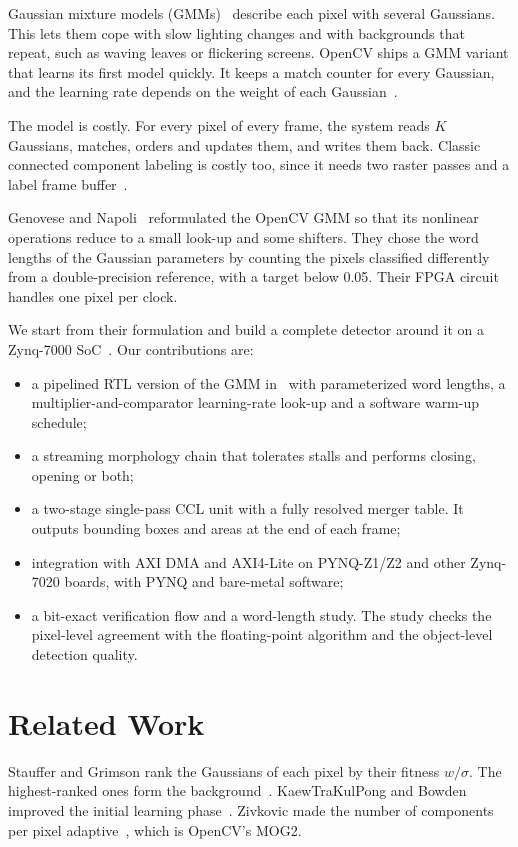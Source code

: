 \documentclass[conference]{IEEEtran}
\begin{document}
Gaussian mixture models (GMMs)~\cite{stauffer1999,kaew2001} describe each pixel
with several Gaussians. This lets them cope with slow lighting changes and with
backgrounds that repeat, such as waving leaves or flickering screens. OpenCV
ships a GMM variant that learns its first model quickly. It keeps a match
counter for every Gaussian, and the learning rate depends on the weight of each
Gaussian~\cite{genovese2014}.

The model is costly. For every pixel of every frame, the system reads $K$
Gaussians, matches, orders and updates them, and writes them back. Classic
connected component labeling is costly too, since it needs two raster passes and
a label frame buffer~\cite{rosenfeld1966}.

Genovese and Napoli~\cite{genovese2014} reformulated the OpenCV GMM so that its
nonlinear operations reduce to a small look-up and some shifters. They chose the
word lengths of the Gaussian parameters by counting the pixels classified
differently from a double-precision reference, with a target below 0.05. Their
FPGA circuit handles one pixel per clock.

We start from their formulation and build a complete detector around it on a
Zynq-7000 SoC~\cite{ug585}. Our contributions are:
\begin{itemize}\setlength{\itemsep}{0pt}\setlength{\parsep}{0pt}\setlength{\topsep}{1pt}
\item a pipelined RTL version of the GMM in~\cite{genovese2014} with
      parameterized word lengths, a multiplier-and-comparator learning-rate
      look-up and a software warm-up schedule;
\item a streaming morphology chain that tolerates stalls and performs closing,
      opening or both;
\item a two-stage single-pass CCL unit with a fully resolved merger table. It
      outputs bounding boxes and areas at the end of each frame;
\item integration with AXI DMA and AXI4-Lite on PYNQ-Z1/Z2 and other Zynq-7020
      boards, with PYNQ and bare-metal software;
\item a bit-exact verification flow and a word-length study. The study checks
      the pixel-level agreement with the floating-point algorithm and the
      object-level detection quality.
\end{itemize}

\section{Related Work}
Stauffer and Grimson rank the Gaussians of each pixel by their fitness
$w/\sigma$. The highest-ranked ones form the background~\cite{stauffer1999}.
KaewTraKulPong and Bowden improved the initial learning phase~\cite{kaew2001}.
Zivkovic made the number of components per pixel adaptive~\cite{zivkovic2004},
which is OpenCV's MOG2.
\end{document}
